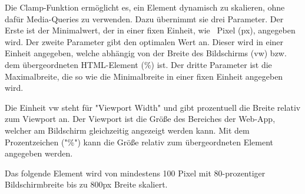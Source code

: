 \label{sec:clamp}

Die Clamp-Funktion ermöglicht es, ein Element dynamisch zu skalieren, ohne dafür Media-Queries zu verwenden. 
Dazu übernimmt sie drei Parameter. 
Der Erste ist der Minimalwert, der in einer fixen Einheit, wie \zb\ Pixel ({\ttfamily px}), angegeben wird. 
Der zweite Parameter gibt den optimalen Wert an. 
Dieser wird in einer Einheit angegeben, welche abhängig von der Breite des Bildschirms ({\ttfamily vw}) bzw. dem übergeordneten HTML-Element ({\ttfamily \%}) ist. 
Der dritte Parameter ist die Maximalbreite, die so wie die Minimalbreite in einer fixen Einheit angegeben wird. 

Die Einheit {\ttfamily vw} steht für "Viewport Width" und gibt prozentuell die Breite relativ zum Viewport an. Der Viewport ist die Größe des Bereiches der Web-App, welcher am Bildschirm gleichzeitig angezeigt werden kann. 
Mit dem Prozentzeichen ("{\ttfamily \%}") kann die Größe relativ zum übergeordneten Element angegeben werden.

Das folgende Element wird von mindestens 100 Pixel mit 80-prozentiger Bildschirmbreite bis zu 800px Breite skaliert.

